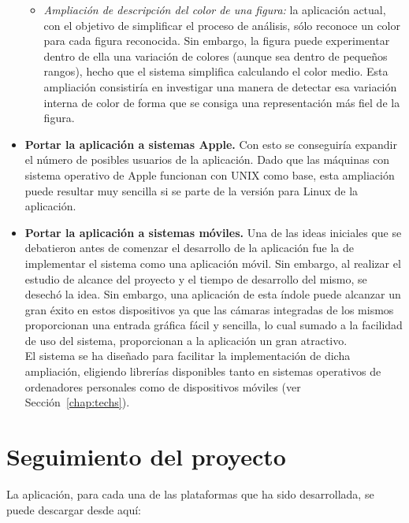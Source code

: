 \begin{itemize}
\begin{itemize}
		\item\textit{Ampliación de descripción del color de una figura:} la aplicación actual, con el objetivo de simplificar el proceso de análisis, sólo reconoce un color para cada figura reconocida. Sin embargo, la figura puede experimentar dentro de ella una variación de colores (aunque sea dentro de pequeños rangos), hecho que el sistema simplifica calculando el color medio. Esta ampliación consistiría en investigar una manera de detectar esa variación interna de color de forma que se consiga una representación más fiel de la figura.
	\end{itemize}
	
\item\textbf{Portar la aplicación a sistemas Apple.} Con esto se conseguiría expandir el número de posibles usuarios de la aplicación. Dado que las máquinas con sistema operativo de Apple funcionan con UNIX como base, esta ampliación puede resultar muy sencilla si se parte de la versión para Linux de la aplicación.

\item\textbf{Portar la aplicación a sistemas móviles.} Una de las ideas iniciales que se debatieron antes de comenzar el desarrollo de la aplicación fue la de implementar el sistema como una aplicación móvil. Sin embargo, al realizar el estudio de alcance del proyecto y el tiempo de desarrollo del mismo, se desechó la idea. Sin embargo, una aplicación de esta índole puede alcanzar un gran éxito en estos dispositivos ya que las cámaras integradas de los mismos proporcionan una entrada gráfica fácil y sencilla, lo cual sumado a la facilidad de uso del sistema, proporcionan a la aplicación un gran atractivo.\\ 

El sistema se ha diseñado para facilitar la implementación de dicha ampliación, eligiendo librerías disponibles tanto en sistemas operativos de ordenadores personales como de dispositivos móviles (ver Sección~\ref{chap:techs}).\\

\end{itemize}


\section{Seguimiento del proyecto}

La aplicación, para cada una de las plataformas que ha sido desarrollada, se puede descargar desde aquí:

